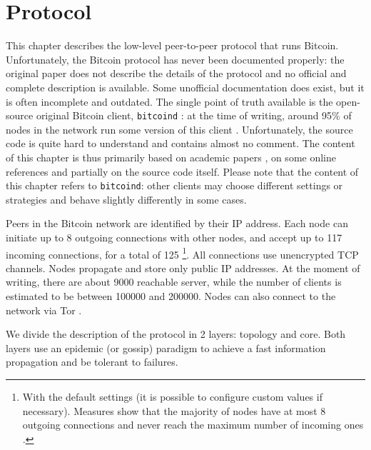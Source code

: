 \chapter{Protocol}
\label{chapter:protocol}
This chapter describes the low-level peer-to-peer protocol that runs Bitcoin.
Unfortunately, the Bitcoin protocol has never been documented properly:
the original paper \cite{bitcoin_2009} does not describe the details of the protocol and no official and complete description is available.
Some unofficial documentation does exist, but it is often incomplete and outdated.
The single point of truth available is the open-source original Bitcoin client, \texttt{bitcoind} \cite{bitcoin_github}:
at the time of writing, around \num{95}\% of nodes in the network run some version of this client \cite{bitnodes}.
Unfortunately, the source code is quite hard to understand and contains almost no comment.
The content of this chapter is thus primarily based on academic papers \cite{eclipse_attack_2015, deanonymization_2014}, on some online references \cite{bitcoin_reference, bitcoin_guide} and partially on the source code itself.
Please note that the content of this chapter refers to \texttt{bitcoind}:
other clients may choose different settings or strategies and behave slightly differently in some cases.

\medskip
Peers in the Bitcoin network are identified by their IP address.
Each node can initiate up to \num{8} outgoing connections with other nodes, and accept up to \num{117} incoming connections, for a total of \num{125} \footnote{With the default settings (it is possible to configure custom values if necessary). Measures show that the majority of nodes have at most \num{8} outgoing connections and never reach the maximum number of incoming ones \cite{discovering_influential_nodes_2014}.}.
All connections use unencrypted TCP channels.
Nodes propagate and store only public IP addresses.
At the moment of writing, there are about \num{9000} reachable server, while the number of clients is estimated to be between \num{100000} and \num{200000}.
Nodes can also connect to the network via Tor \cite{bicoin_tor}.

\medskip
We divide the description of the protocol in \num{2} layers: topology and core.
Both layers use an epidemic (or gossip) paradigm \cite{gossip_1987} to achieve a fast information propagation and be tolerant to failures.


